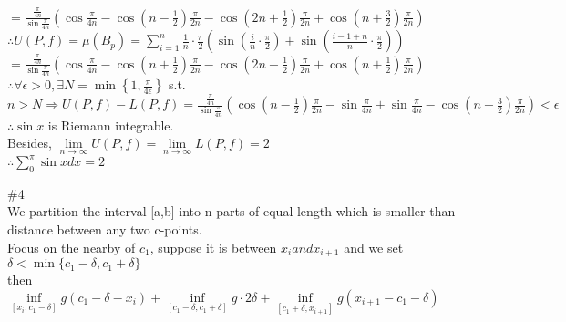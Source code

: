 \documentclass{article}
\begin{document}
\qquad\qquad\qquad\qquad\qquad$=\displaystyle\frac{\frac{\pi}{4n}}{\sin\frac{\pi}{4n}}\left(\cos\frac{\pi}{4n}-\cos\left(n-\frac{1}{2}\right)\frac{\pi}{2n}-\cos\left(2n+\frac{1}{2}\right)\frac{\pi}{2n}+\cos\left(n+\frac{3}{2}\right)\frac{\pi}{2n}\right)$\\

$\therefore$\qquad$\displaystyle U(P,f)=\mu(B_p)=\sum \limits_{i=1}^n\frac{1}{n}\cdot\frac{\pi}{2}\left(\sin\left(\frac{i}{n}\cdot\frac{\pi}{2}\right)+\sin\left(\frac{i-1+n}{n}\cdot\frac{\pi}{2}\right)\right)$\\

\qquad\qquad\qquad\qquad\qquad$=\displaystyle\frac{\frac{\pi}{4n}}{\sin\frac{\pi}{4n}}\left(\cos\frac{\pi}{4n}-\cos\left(n+\frac{1}{2}\right)\frac{\pi}{2n}-\cos\left(2n-\frac{1}{2}\right)\frac{\pi}{2n}+\cos\left(n+\frac{1}{2}\right)\frac{\pi}{2n}\right)$\\

$\therefore$\qquad$\displaystyle\forall\epsilon>0, \exists N=\min \left\{1,\frac{\pi}{4\epsilon}\right\}$ s.t.\\

$n>N\Rightarrow\displaystyle U(P,f)-L(P,f)=\frac{\frac{\pi}{4n}}{\sin\frac{\pi}{4n}}\left(\cos\left(n-\frac{1}{2}\right)\frac{\pi}{2n}-\sin\frac{\pi}{4n}+\sin\frac{\pi}{4n}-\cos\left(n+\frac{3}{2}\right)\frac{\pi}{2n}\right)<\epsilon$\\

$\therefore$\qquad$\sin x$ is Riemann integrable.\\

Besides, $\displaystyle\lim \limits_{n \to \infty}U(P,f)=\lim \limits_{n \to \infty}L(P,f)=2$\\

$\therefore$\qquad$\displaystyle \sum \limits_0^\pi\sin xdx=2$\\

\vskip 2cm

\textcolor[rgb]{0.00,0.00,0.50}{\#4}\\

We partition the interval [a,b] into n parts of equal length which is smaller than distance between any two c-points.\\

Focus on the nearby of $c_1$, suppose it is between $x_i and x_{i+1}$ and we set $\delta<\min\{c_1-\delta,c_1+\delta\}$\\

then $\displaystyle\inf \limits_{[x_i,c_1-\delta]}g(c_1-\delta-x_i)+\inf \limits_{[c_1-\delta,c_1+\delta]}g\cdot2\delta+\inf \limits_{[c_1+\delta,x_{i+1}]}g(x_{i+1}-c_1-\delta)$\\
\end{document}
